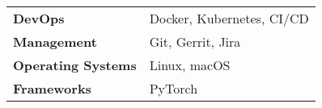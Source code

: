 

\begin{cvparagraph}

\vspace*{0.2cm}

\begin{tabularx}{\linewidth}{@{}lX}
    \textbf{DevOps}            & Docker, Kubernetes, CI/CD \\
    \textbf{Management}        & Git, Gerrit, Jira \\
    \textbf{Operating Systems} & Linux, macOS \\
    \textbf{Frameworks}        & PyTorch
 \end{tabularx}

\end{cvparagraph}
